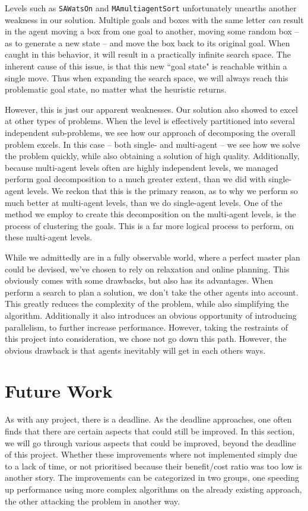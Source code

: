 \documentclass[letterpaper]{article}
\begin{document}
	Levels such as \verb=SAWatsOn= and \verb=MAmultiagentSort= unfortunately unearths another weakness in our solution. Multiple goals and boxes with the same letter \emph{can} result in the agent moving a box from one goal to another, moving some random box -- as to generate a new state -- and move the box back to its original goal. When caught in this behavior, it will result in a practically infinite search space. The inherent cause of this issue, is that this new ``goal state" is reachable within a single move. Thus when expanding the search space, we will always reach this problematic goal state, no matter what the heuristic returns.

	However, this is just our apparent weaknesses. Our solution also showed to excel at other types of problems. When the level is effectively partitioned into several independent sub-problems, we see how our approach of decomposing the overall problem excels. In this case -- both single- and multi-agent -- we see how we solve the problem quickly, while also obtaining a solution of high quality. Additionally, because multi-agent levels often are highly independent levels, we managed perform goal decomposition to a much greater extent, than we did with single-agent levels. We reckon that this is the primary reason, as to why we perform so much better at multi-agent levels, than we do single-agent levels. One of the method we employ to create this decomposition on the multi-agent levels, is the process of clustering the goals. This is a far more logical process to perform, on these multi-agent levels.

	While we admittedly are in a fully observable world, where a perfect master plan could be devised, we've chosen to rely on relaxation and online planning. This obviously comes with some drawbacks, but also has its advantages. When perform a search to plan a solution, we don't take the other agents into account. This greatly reduces the complexity of the problem, while also simplifying the algorithm. Additionally it also introduces an obvious opportunity of introducing parallelism, to further increase performance. However, taking the restraints of this project into consideration, we chose not go down this path. However, the obvious drawback is that agents inevitably will get in each others ways.
	
\section{Future Work}
	As with any project, there is a deadline. As the deadline approaches, one often finds that there are certain aspects that could still be improved. In this section, we will go through various aspects that could be improved, beyond the deadline of this project. Whether these improvements where not implemented simply due to a lack of time, or not prioritised because their benefit/cost ratio was too low is another story. The improvements can be categorized in two groups, one speeding up performance using more complex algorithms on the already existing approach, the other attacking the problem in another way.
	
\end{document}
